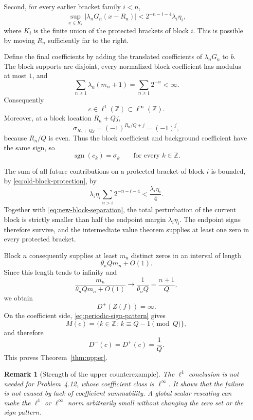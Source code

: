 \documentclass[11pt]{article}
\newtheorem{remark}[theorem]{Remark}
\newcommand{\Z}{\mathbb{Z}}
\newcommand{\sgn}{\operatorname{sgn}}
\begin{document}
Second, for every earlier bracket family $i<n$,
\begin{equation}\label{eq:old-block-protection}
 \sup_{x\in K_i}|\lambda_nG_n(x-R_n)|
 <2^{-n-i-4}\lambda_i\eta_i,
\end{equation}
where $K_i$ is the finite union of the protected brackets of block $i$. This is possible by moving $R_n$ sufficiently far to the right.

Define the final coefficients by adding the translated coefficients of $\lambda_nG_n$ to $b$. The block supports are disjoint, every normalized block coefficient has modulus at most $1$, and
\[
 \sum_{n\ge1}\lambda_n(m_n+1)=\sum_{n\ge1}2^{-n}<\infty.
\]
Consequently
\[
 c\in\ell^1(\Z)\subset\ell^\infty(\Z).
\]
Moreover, at a block location $R_n+Qj$,
\[
 \sigma_{R_n+Qj}=(-1)^{R_n/Q+j}=(-1)^j,
\]
because $R_n/Q$ is even. Thus the block coefficient and background coefficient have the same sign, so
\begin{equation}\label{eq:periodic-sign-pattern}
 \sgn(c_k)=\sigma_k\qquad\text{for every }k\in\Z.
\end{equation}

The sum of all future contributions on a protected bracket of block $i$ is bounded, by \eqref{eq:old-block-protection}, by
\[
 \lambda_i\eta_i\sum_{n>i}2^{-n-i-4}<\frac{\lambda_i\eta_i}{4}.
\]
Together with \eqref{eq:new-block-separation}, the total perturbation of the current block is strictly smaller than half the endpoint margin $\lambda_i\eta_i$. The endpoint signs therefore survive, and the intermediate value theorem supplies at least one zero in every protected bracket.

Block $n$ consequently supplies at least $m_n$ distinct zeros in an interval of length
\[
 \theta_nQm_n+O(1).
\]
Since this length tends to infinity and
\[
 \frac{m_n}{\theta_nQm_n+O(1)}\longrightarrow
 \frac1{\theta_nQ}=\frac{n+1}{Q},
\]
we obtain
\[
 \boxed{D^+(Z(f))=\infty.}
\]
On the coefficient side, \eqref{eq:periodic-sign-pattern} gives
\[
 M(c)=\{k\in\Z:\ k\equiv Q-1\pmod Q\},
\]
and therefore
\[
 \boxed{D^-(c)=D^+(c)=\frac1Q.}
\]
This proves Theorem~\ref{thm:upper}.

\begin{remark}[Strength of the upper counterexample]
The $\ell^1$ conclusion is not needed for Problem~4.12, whose coefficient class is $\ell^\infty$. It shows that the failure is not caused by lack of coefficient summability. A global scalar rescaling can make the $\ell^1$ or $\ell^\infty$ norm arbitrarily small without changing the zero set or the sign pattern.
\end{remark}
\end{document}
